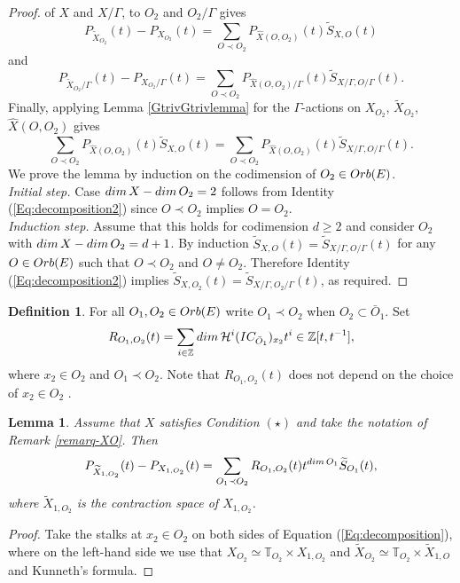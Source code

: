 \documentclass[11pt, reqno]{amsart}
\theoremstyle{plain}
\newtheorem{lemma}[theorem]{Lemma}
\theoremstyle{definition}
\newtheorem{definition}[theorem]{Definition}
\theoremstyle{remark}
\begin{document}
\begin{proof}
of $X$ and $X/\Gamma$, to $O_{2}$ and $O_{2}/\Gamma$ gives
$$P_{\widetilde{X}_{O_{2}}}(t) - P_{X_{O_{2}}}(t) = \sum_{O\prec O_{2}} P_{\widehat{X}(O, O_{2})}(t) \widetilde{S}_{X, O}(t)$$
and 
$$P_{\widetilde{X}_{O_{2}}/\Gamma}(t) - P_{X_{O_{2}}/\Gamma}(t) = \sum_{O\prec O_{2}} P_{\widehat{X}(O, O_{2})/\Gamma}(t) \widetilde{S}_{X/\Gamma, O/\Gamma}(t).$$
Finally, applying Lemma \ref{GtrivGtrivlemma} for the $\Gamma$-actions on $X_{O_{2}}$, $\widetilde{X}_{O_{2}}$, $\widehat{X}(O, O_{2})$ gives
\begin{equation}\label{Eq:decomposition2}
\sum_{O\prec O_{2}} P_{\widehat{X}(O, O_{2})}(t) \widetilde{S}_{X, O}(t) =   \sum_{O\prec O_{2}} P_{\widehat{X}(O, O_{2})}(t) \widetilde{S}_{X/\Gamma, O/\Gamma}(t).
\end{equation}
We prove the lemma by induction on the codimension of $O_{2}\in {\rm Orb}(E)$. 
\\

\emph{Initial step.} Case ${\rm dim}\, X -  {\rm dim}\, O_{2} = 2$ follows from Identity (\ref{Eq:decomposition2}) since $O\prec O_{2}$ implies 
$O =  O_{2}$.
\\

\emph{Induction step.} Assume that this holds for codimension $d\geq 2$ and consider $O_{2}$ with ${\rm dim}\, X - {\rm dim}\, O_{2} =  d+1$. By induction $\widetilde{S}_{X, O}(t) =  \widetilde{S}_{X/\Gamma, O/\Gamma}(t)$ for any $O\in {\rm Orb}(E)$ such that $O\prec O_{2}$ and $O\neq O_{2}$. Therefore  Identity (\ref{Eq:decomposition2}) implies  $\widetilde{S}_{X, O_{2}}(t) =  \widetilde{S}_{X/\Gamma, O_{2}/\Gamma}(t)$, as required. 
\end{proof}


\begin{definition}
For all $O_{1}, O_{2}\in {\rm Orb}(E)$ write $O_{1}\prec O_{2}$ when $O_{2}\subset \bar{O}_{1}$. Set
$$R_{O_{1}, O_{2}}(t)  =  \sum_{i\in\mathbb{Z}}{\rm dim}\, \mathcal{H}^{i}(IC_{\bar{O}_{1}})_{x_{2}}t^{i}\in\mathbb{Z}[t, t^{-1}],$$
where $x_{2}\in O_{2}$ and $O_{1}\prec O_{2}$. Note that $R_{O_{1}, O_{2}}(t)$ does not depend on the choice of $x_{2}\in O_{2}$ \cite[Remark 5.21]{AL21}.
\end{definition}



\begin{lemma}\label{lemma-RT} Assume that $X$ satisfies Condition $(\star)$ and take the notation of Remark \ref{remarq-XO}. Then
$$P_{\widetilde{X}_{1,O_{2}}}(t)- P_{X_{1, O_{2}}}(t) =  \sum_{O_{1}\prec O_{2}}R_{O_{1}, O_{2}}(t)t^{{\rm dim}\, O_{1}}\widetilde{S}_{O_{1}}(t),$$
where $\widetilde{X}_{1, O_{2}}$ is the contraction space of $X_{1, O_{2}}$. 
\end{lemma}
\begin{proof}
Take the stalks at $x_{2}\in O_{2}$ on both sides of Equation (\ref{Eq:decomposition}), where on the left-hand side we  use that
 $X_{O_{2}}\simeq \mathbb{T}_{O_{2}}\times X_{1, O_{2}}$ and $\widetilde{X}_{O_{2}}\simeq \mathbb{T}_{O_{2}}\times \widetilde{X}_{1, O}$
and Kunneth's formula.
\end{proof}
\end{document}
